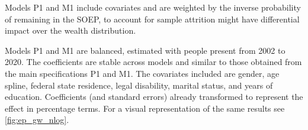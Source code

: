 \begin{table}[htb!]
\begin{adjustbox}{max width=\textwidth}
\begin{threeparttable}
\begin{tablenotes}
                \item Models P1 and M1 include covariates and are weighted by the inverse probability of remaining in the SOEP, to account for sample attrition might have differential impact over the wealth
                distribution. \\
                \item Models P1 and M1 are balanced, estimated with people present from 2002 to 2020.
                The coefficients are stable across models and similar to those obtained from the 
                main specifications P1 and M1. 
                The covariates included are gender, age spline, federal state residence, legal disability, marital status, and years of education.
                Coefficients (and standard errors) already transformed to represent the effect in percentage terms. 
                For a visual representation of the same results see \cref{fig:ep_gw_nlog}.
            \end{tablenotes}
        \end{threeparttable}
    \end{adjustbox}
\end{table} %



